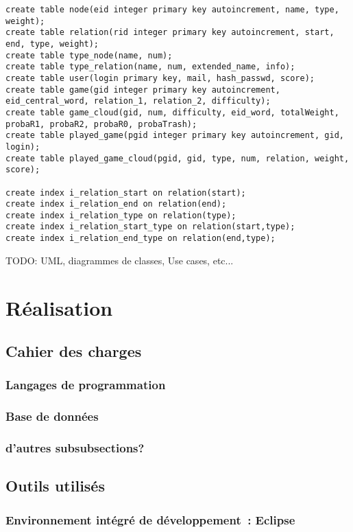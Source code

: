 \documentclass[a4paper,11pt,french]{article}
\begin{document}
\begin{verbatim}
create table node(eid integer primary key autoincrement, name, type, weight);
create table relation(rid integer primary key autoincrement, start, end, type, weight);
create table type_node(name, num);
create table type_relation(name, num, extended_name, info);
create table user(login primary key, mail, hash_passwd, score);
create table game(gid integer primary key autoincrement, eid_central_word, relation_1, relation_2, difficulty);
create table game_cloud(gid, num, difficulty, eid_word, totalWeight, probaR1, probaR2, probaR0, probaTrash);
create table played_game(pgid integer primary key autoincrement, gid, login);
create table played_game_cloud(pgid, gid, type, num, relation, weight, score);

create index i_relation_start on relation(start);
create index i_relation_end on relation(end);
create index i_relation_type on relation(type);
create index i_relation_start_type on relation(start,type);
create index i_relation_end_type on relation(end,type);
\end{verbatim}

TODO: UML, diagrammes de classes, Use cases, etc...


\section{Réalisation}
\subsection{Cahier des charges}
\subsubsection{Langages de programmation}
\subsubsection{Base de données}
\subsubsection{d'autres subsubsections?}

\subsection{Outils utilisés}
\subsubsection{Environnement intégré de développement~: Eclipse}
\end{document}
